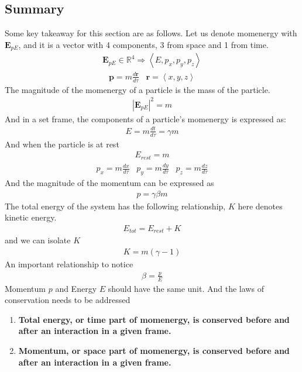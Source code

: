 \documentclass[12pt]{book}
\newcommand{\R}{\mathbb{R}}
\newcommand{\dydx}[2]{\frac{d #1}{d #2}}
\newcommand{\tribkt}[1]{\left< #1 \right>}
\newcommand{\abso}[1]{\left|#1 \right|}
\begin{document}
\subsection{Summary}
Some key takeaway for this section are as follows. Let us denote momenergy with $\textbf{E}_{pE}$, and it is a vector with 4 components, 3 from space and 1 from time. 
\begin{align}
\textbf{E}_{pE} \in \R ^4 \Rightarrow \tribkt{E,p_x,p_y,p_z}
\end{align}
\begin{align}
\textbf{p} = m\dydx{\textbf{r}}{\tau} \;\;\; \textbf{r} = \tribkt{x,y,z}
\end{align}
The magnitude of the momenergy of a particle is the mass of the particle. 
\begin{align}
\abso{\textbf{E}_{pE}}^2 = m
\end{align}
And in a set frame, the components of a particle's momenergy is expressed as:
\begin{align}
E = m\dydx{t}{\tau} = \gamma m
\end{align}
And when the particle is at rest
\begin{align}
E_{rest} = m
\end{align}
\begin{align}
p_x = m\dydx{x}{\tau}\;\;\; p_y = m\dydx{y}{\tau}\;\;\; p_z = m\dydx{z}{\tau}
\end{align}
And the magnitude of the momentum can be expressed as
\begin{align}
p = \gamma \beta m
\end{align}
The total energy of the system has the following relationship, $K$ here denotes kinetic energy.
\begin{align}
E_{tot}=E_{rest} + K
\end{align}
and we can isolate $K$
\begin{align}
K = m(\gamma -1)
\end{align}
An important relationship to notice
\begin{align}
\beta = \frac{p}{E}
\end{align}
 Momentum $p$ and Energy $E$ should have the same unit.
\newpage
And the laws of conservation needs to be addressed
\begin{enumerate}
    \item \textbf{Total energy, or time part of momenergy, is conserved before and after an interaction in a given frame.}
    \item \textbf{Momentum, or space part of momenergy, is conserved before and after an interaction in a given frame. }
\end{enumerate}
\end{document}
